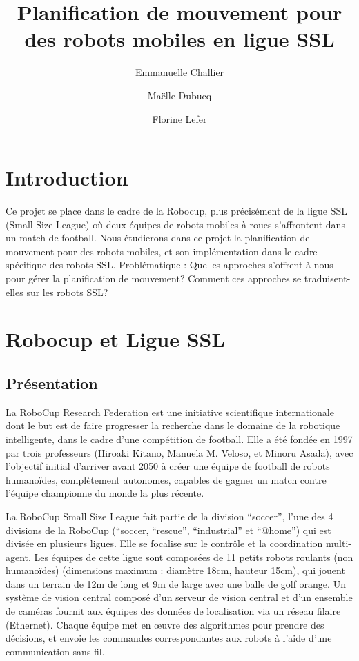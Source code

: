 \documentclass{article}
\title{Planification de mouvement pour des robots mobiles en ligue SSL}
\author{Emmanuelle Challier \and Ma\"elle Dubucq \and Florine Lefer}
\begin{document}
\maketitle

\section{Introduction}
\label{intro}
Ce projet se place dans le cadre de la Robocup, plus précisément de la ligue SSL (Small Size League) où deux équipes de robots mobiles à roues s'affrontent dans un match de football. Nous étudierons dans ce projet la planification de mouvement pour des robots mobiles, et son implémentation dans le cadre spécifique des robots SSL.
Problématique : Quelles approches s'offrent à nous pour gérer la planification de mouvement? Comment ces approches se traduisent-elles sur les robots SSL?

\section{Robocup et Ligue SSL}
\subsection{Présentation}
La RoboCup Research Federation est une initiative scientifique internationale dont le but est de faire progresser la recherche dans le domaine de la robotique intelligente, dans le cadre d’une compétition de football. Elle a été fondée en 1997 par trois professeurs (Hiroaki Kitano, Manuela M. Veloso, et Minoru Asada), avec l’objectif initial d’arriver avant 2050 à créer une équipe de football de robots humanoïdes, complètement autonomes, capables de gagner un match contre l’équipe championne du monde la plus récente.

La RoboCup Small Size League fait partie de la division “soccer”, l’une des 4 divisions de la RoboCup (“soccer, “rescue”, “industrial” et “@home”) qui est divisée en plusieurs ligues. Elle se focalise sur le contrôle et la coordination multi-agent. Les équipes de cette ligue sont composées de 11 petits robots roulants (non humanoïdes) (dimensions maximum : diamètre 18cm, hauteur 15cm), qui jouent dans un terrain de 12m de long et 9m de large avec une balle de golf orange. Un système de vision central composé d’un serveur de vision central et d’un ensemble de caméras fournit aux équipes des données de localisation via un réseau filaire (Ethernet). Chaque équipe met en œuvre des algorithmes pour prendre des décisions, et envoie les commandes correspondantes aux robots à l’aide d’une communication sans fil.
\end{document}
